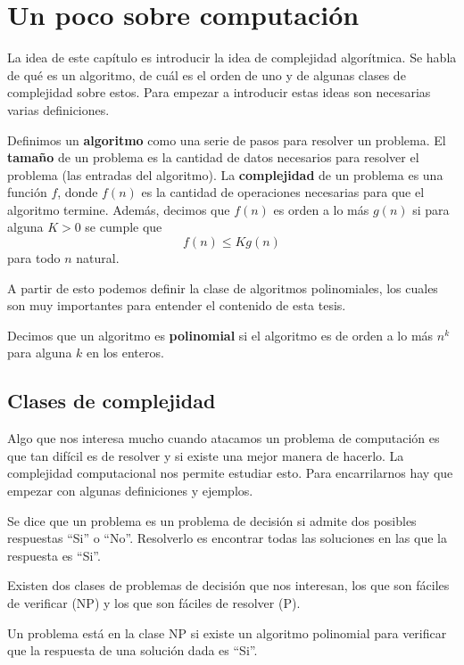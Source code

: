 \chapter{Un poco sobre computación}

La idea de este capítulo es introducir la idea de complejidad algorítmica. Se habla de qué es un algoritmo, de cuál es el orden de uno y de algunas clases de complejidad sobre estos. Para empezar a introducir estas ideas son necesarias varias definiciones. 

\begin{dfn} \cite{Ramon}
Definimos un \textbf{algoritmo} como una serie de pasos para resolver un problema. El \textbf{tamaño} de un problema es la cantidad de datos necesarios para resolver el problema (las entradas del algoritmo). La \textbf{complejidad} de un problema es una función $f$, donde $f(n)$ es la cantidad de operaciones necesarias para que el algoritmo termine. Además, decimos que $f(n)$ es orden a lo más $g(n)$ si para alguna $K>0$ se cumple que
$$f(n) \leq Kg(n)$$
para todo $n$ natural.
\end{dfn}

A partir de esto podemos definir la clase de algoritmos polinomiales, los cuales son muy importantes para entender el contenido de esta tesis. 

\begin{dfn}
Decimos que un algoritmo es \textbf{polinomial} si el algoritmo es de orden a lo más $n^k$ para alguna $k$ en los enteros. 
\end{dfn}


\section{Clases de complejidad}
Algo que nos interesa mucho cuando atacamos un problema de computación es que tan difícil es de resolver y si existe una mejor manera de hacerlo. La complejidad computacional nos permite estudiar esto. Para encarrilarnos hay que empezar con algunas definiciones y ejemplos.
\begin{dfn}
Se dice que un problema es un problema de decisión si admite dos posibles respuestas ``Si'' o ``No''. Resolverlo es encontrar todas las soluciones en las que la respuesta es ``Si''.
\end{dfn}
Existen dos clases de problemas de decisión que nos interesan, los que son fáciles de verificar (NP) y los que son fáciles de resolver (P).
\begin{dfn}
Un problema está en la clase NP si existe un algoritmo polinomial para verificar que la respuesta de una solución dada es ``Si''.
\end{dfn}

